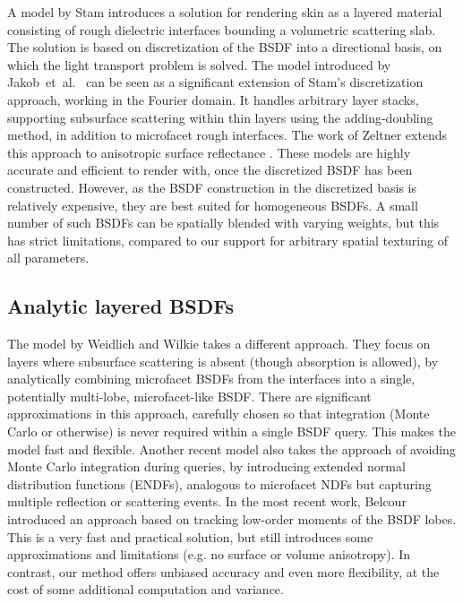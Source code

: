 A model by Stam  introduces a solution for rendering skin as a layered material consisting of rough dielectric interfaces bounding a volumetric scattering slab. The solution is based on discretization of the BSDF into a directional basis, on which the light transport problem is solved. The model introduced by Jakob~et~al.~ can be seen as a significant extension of Stam's discretization approach, working in the Fourier domain. It handles arbitrary layer stacks, supporting subsurface scattering within thin layers using the adding-doubling method, in addition to microfacet rough interfaces. The work of Zeltner extends this approach to anisotropic surface reflectance . These models are highly accurate and efficient to render with, once the discretized BSDF has been constructed. However, as the BSDF construction in the discretized basis is relatively expensive, they are best suited for homogeneous BSDFs. A small number of such BSDFs can be spatially blended with varying weights, but this has strict limitations, compared to our support for arbitrary spatial texturing of all parameters.

\subsection{Analytic layered BSDFs}
The model by Weidlich and Wilkie  takes a different approach. They focus on layers where subsurface scattering is absent (though absorption is allowed), by analytically combining microfacet BSDFs from the interfaces into a single, potentially multi-lobe, microfacet-like BSDF. There are significant approximations in this approach, carefully chosen so that integration (Monte Carlo or otherwise) is never required within a single BSDF query. This makes the model fast and flexible. Another recent model \cite{guo2017rendering} also takes the approach of avoiding Monte Carlo integration during queries, by introducing extended normal distribution functions (ENDFs), analogous to microfacet NDFs but capturing multiple reflection or scattering events. In the most recent work, Belcour  introduced an approach based on tracking low-order moments of the BSDF lobes. This is a very fast and practical solution, but still introduces some approximations and limitations (e.g. no surface or volume anisotropy). In contrast, our method offers unbiased accuracy and even more flexibility, at the cost of some additional computation and variance. 

